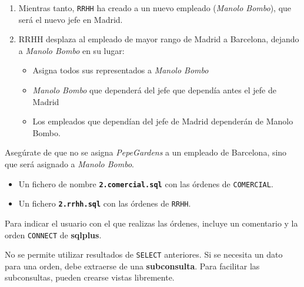\newpage

\begin{homeworkProblem}

  {

    \begin{enumerate}
    \item Mientras tanto, \texttt{RRHH} ha creado a un nuevo empleado (\textit{Manolo Bombo}), que será el nuevo jefe en Madrid.
    \item RRHH desplaza al empleado de mayor rango de Madrid a Barcelona, dejando a \textit{Manolo Bombo} en su lugar:
      \begin{itemize}
      \item Asigna todos sus representados a \textit{Manolo Bombo}
      \item \textit{Manolo Bombo} que dependerá del jefe que dependía antes el jefe de Madrid
      \item Los empleados que dependían del jefe de Madrid dependerán de Manolo Bombo.
      \end{itemize}
    \end{enumerate}
    }
  Asegúrate de que no se asigna \textit{PepeGardens} a un empleado de Barcelona, sino que será asignado a \textit{Manolo Bombo}.

  \begin{Aviso}
    \begin{itemize}
    \item Un fichero de nombre \textbf{\texttt{2.comercial.sql}} con las órdenes de \texttt{COMERCIAL}.
    \item Un fichero \textbf{\texttt{2.rrhh.sql}} con las órdenes de \texttt{RRHH}.
    \end{itemize}

    Para indicar el usuario con el que realizas las órdenes, incluye un comentario y la orden  \texttt{CONNECT} de \textbf{sqlplus}.
    
    No se permite utilizar resultados de \texttt{SELECT} anteriores. Si se necesita un dato para una orden, debe extraerse de una \textbf{subconsulta}. Para facilitar las subconsultas, pueden crearse vistas libremente.
  \end{Aviso}

\end{homeworkProblem}

